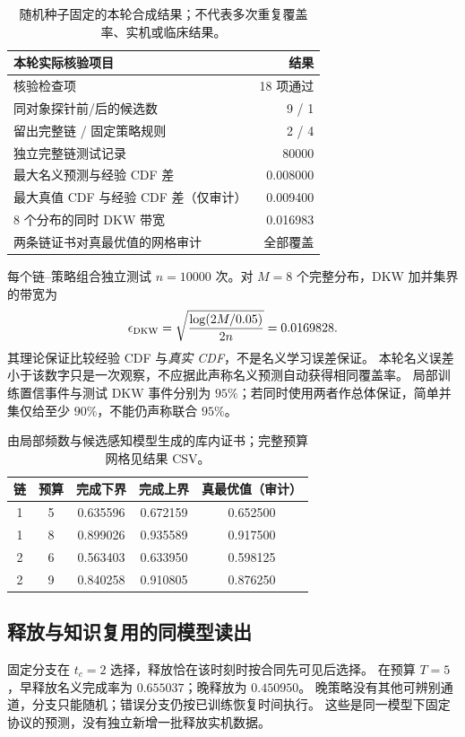 \documentclass[11pt,a4paper,fontset=fandol]{ctexart}
\theoremstyle{definition}
\theoremstyle{remark}
\numberwithin{equation}{section}
\begin{document}
\begin{table}[htbp]\centering\small
\begin{tabularx}{\linewidth}{Y r}
\toprule
本轮实际核验项目 & 结果\\\midrule
核验检查项 & 18 项通过\\
同对象探针前/后的候选数 & 9 / 1\\
留出完整链 / 固定策略规则 & 2 / 4\\
独立完整链测试记录 & 80000\\
最大名义预测与经验 CDF 差 & 0.008000\\
最大真值 CDF 与经验 CDF 差（仅审计） & 0.009400\\
8 个分布的同时 DKW 带宽 & 0.016983\\
两条链证书对真最优值的网格审计 & 全部覆盖\\
\bottomrule
\end{tabularx}
\caption{随机种子固定的本轮合成结果；不代表多次重复覆盖率、实机或临床结果。}
\end{table}

每个链--策略组合独立测试 $n=10000$ 次。对 $M=8$ 个完整分布，DKW 加并集界的带宽为
\begin{equation}
 \epsilon_{\rm DKW}=
 \sqrt{\frac{\log(2M/0.05)}{2n}}=0.0169828 .
 \label{eq:dkw}
\end{equation}
其理论保证比较经验 CDF 与\emph{真实 CDF}，不是名义学习误差保证。
本轮名义误差小于该数字只是一次观察，不应据此声称名义预测自动获得相同覆盖率。
局部训练置信事件与测试 DKW 事件分别为 $95\%$；若同时使用两者作总体保证，简单并集仅给至少 $90\%$，不能仍声称联合 $95\%$。

\begin{table}[htbp]\centering\small
\begin{tabular}{c c c c c}
\toprule
链 & 预算 & 完成下界 & 完成上界 & 真最优值（审计）\\\midrule
1 & 5 & 0.635596 & 0.672159 & 0.652500\\
1 & 8 & 0.899026 & 0.935589 & 0.917500\\
2 & 6 & 0.563403 & 0.633950 & 0.598125\\
2 & 9 & 0.840258 & 0.910805 & 0.876250\\
\bottomrule
\end{tabular}
\caption{由局部频数与候选感知模型生成的库内证书；完整预算网格见结果 CSV。}
\end{table}

\subsection{释放与知识复用的同模型读出}
固定分支在 $t_c=2$ 选择，释放恰在该时刻时按合同先可见后选择。
在预算 $T=5$，早释放名义完成率为 $0.655037$；晚释放为 $0.450950$。
晚策略没有其他可辨别通道，分支只能随机；错误分支仍按已训练恢复时间执行。
这些是同一模型下固定协议的预测，没有独立新增一批释放实机数据。
\end{document}

